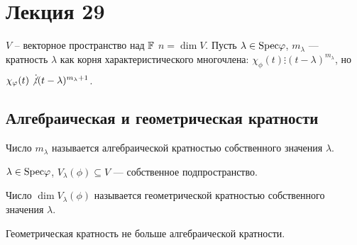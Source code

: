 \section*{Лекция 29}
%

$V$ -- векторное пространство над $\F$ $n = \dim V$. Пусть $\lambda \in \Spec \phi$, $m_{\lambda}$ --- кратность $\lambda$ как корня характеристического многочлена: $\chi_{\phi}(t) \vdots (t - \lambda)^{m_{\lambda}}$, но $\chi_{\phi}(t) \not \vdots (t - \lambda)^{m_{\lambda} + 1}$.

\subsection*{Алгебраическая и геометрическая кратности}
%

\begin{Def}
  Число $m_{\lambda}$ называется алгебраической кратностью собственного значения $\lambda$.
\end{Def}

$\lambda \in \Spec \phi$, $V_{\lambda}(\phi) \subseteq V$ --- собственное подпространство.

\begin{Def}
  Число $\dim V_{\lambda}(\phi)$ называется геометрической кратностью собственного значения $\lambda$.
\end{Def}

\begin{Suggestion}
  Геометрическая кратность не больше алгебраической кратности.
\end{Suggestion}

